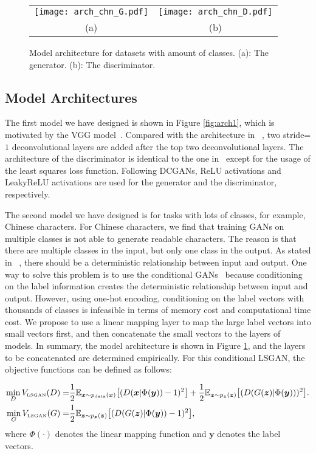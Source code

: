 \documentclass{article} %
\begin{document}
\begin{figure}[h]
\centering
\begin{tabular}{cc}
 \texttt{[image: arch\_chn\_G.pdf]}
 &
 \texttt{[image: arch\_chn\_D.pdf]}
\\
(a)
&
(b)
\end{tabular}
\caption{
 Model architecture for datasets with amount of classes. (a): The generator. (b): The discriminator.
}
\label{fig:arch2}
\end{figure}

\subsection{Model Architectures}
\label{sec:arch}
The first model we have designed is shown in Figure \ref{fig:arch1}, which is motivated by the VGG model~\cite{Simonyan2014}. Compared with the architecture in ~\cite{Radford2015}, two stride=$1$ deconvolutional layers are added after the top two deconvolutional layers. The architecture of the discriminator is identical to the one in~\cite{Radford2015} except for the usage of the least squares loss function. Following DCGANs, ReLU activations and LeakyReLU activations are used for the generator and the discriminator, respectively.



The second model we have designed is for tasks with lots of classes, for example, Chinese characters. For Chinese characters, we find that training GANs on multiple classes is not able to generate readable characters. The reason is that there are multiple classes in the input, but only one class in the output. As stated in ~\cite{Hornik1989}, there should be a deterministic relationship between input and output. One way to solve this problem is to use the conditional GANs~\cite{Mirza2014} because conditioning on the label information creates the deterministic relationship between input and output. However, using one-hot encoding, conditioning on the label vectors with thousands of classes is infeasible in terms of memory cost and computational time cost. We propose to use a linear mapping layer to map the large label vectors into small vectors first, and then concatenate the small vectors to the layers of models. In summary, the model architecture is shown in Figure \ref{fig:arch2}, and the layers to be concatenated are determined empirically. For this conditional LSGAN, the objective functions can be defined as follows:

\begin{equation}
\label{eq_clsgan}
\begin{split}
\min_D V_{\text{\tiny LSGAN}}(D) = &\frac{1}{2}\mathbb{E}_{\bm{x} \sim p_{\text{data}}(\bm{x})}\bigl[(D(\bm{x}|\Phi(\bm{y}))-1)^2\bigr] + \frac{1}{2}\mathbb{E}_{\bm{z} \sim p_{\bm{z}}(\bm{z})}\bigl[(D(G(\bm{z})|\Phi(\bm{y})))^2\bigr]. \\
\min_G V_{\text{\tiny LSGAN}}(G) = &\frac{1}{2}\mathbb{E}_{\bm{z} \sim p_{\bm{z}}(\bm{z})}\bigl[(D(G(\bm{z})|\Phi(\bm{y}))-1)^2\bigr],
\end{split}
\end{equation}
where $\Phi(\cdot)$ denotes the linear mapping function and $\bm{y}$ denotes the label vectors.
\end{document}
